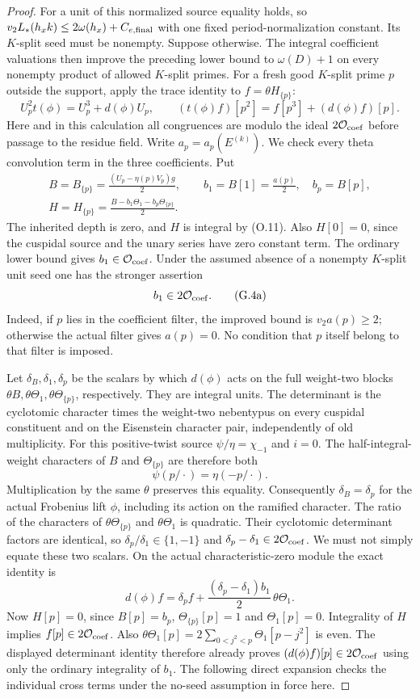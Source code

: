 \begin{proof}
For a unit of this normalized source equality holds, so
$v_2L_*(h_xk)\le2\omega(h_x)+C_{e,\rm final}$ with one fixed
period-normalization constant.
Its $K$-split seed must be nonempty. Suppose otherwise. The integral
coefficient valuations then improve the preceding lower bound to
$\omega(D)+1$ on every nonempty product of allowed $K$-split primes.
For a fresh good $K$-split prime $p$ outside the support, apply the
trace identity to $f=\theta H_{\{p\}}$:
\[
 U_p^2t(\phi)=U_p^3+d(\phi)U_p,\qquad
 (t(\phi)f)[p^2]=f[p^3]+(d(\phi)f)[p].
\]
Here and in this calculation all congruences are modulo the ideal
$2\mathcal O_{\rm coef}$ before passage to the residue field.
Write $a_p=a_p(E^{(k)})$.
We check every theta convolution term in the three coefficients.
Put
\[
\begin{gathered}
 B=B_{\{p\}}=\frac{(U_p-\eta(p)V_p)g}{2},\qquad
 b_1=B[1]=\frac{a(p)}2,\quad b_p=B[p],\\
 H=H_{\{p\}}=\frac{B-b_1\Theta_1-b_p\Theta_{\{p\}}}{2}.
\end{gathered}
\]
The inherited depth is zero, and $H$ is integral by (O.11).
Also $H[0]=0$, since the cuspidal source and the unary series have
zero constant term.
The ordinary lower bound gives $b_1\in\mathcal O_{\rm coef}$.
Under the assumed absence of a nonempty $K$-split unit seed one
has the stronger assertion
\[
                         b_1\in2\mathcal O_{\rm coef}.          \tag{G.4a}
\]
Indeed, if $p$ lies in the coefficient filter, the improved bound is
$v_2a(p)\ge2$; otherwise the actual filter gives $a(p)=0$.
No condition that $p$ itself belong to that filter is imposed.

Let $\delta_B,\delta_1,\delta_p$ be the scalars by which $d(\phi)$
acts on the full weight-two blocks
$\theta B,\theta\Theta_1,\theta\Theta_{\{p\}}$, respectively.
They are integral units.  The determinant is the cyclotomic character
times the weight-two nebentypus on every cuspidal constituent and
on the Eisenstein character pair, independently of old multiplicity.
For this positive-twist source $\psi/\eta=\chi_{-1}$ and $i=0$.
The half-integral-weight characters of $B$ and $\Theta_{\{p\}}$
are therefore both
\[
                 \psi(p/\cdot)=\eta(-p/\cdot).
\]
Multiplication by the same $\theta$ preserves this equality.
Consequently $\delta_B=\delta_p$ for the actual Frobenius lift
$\phi$, including its action on the ramified character.  The ratio
of the characters of $\theta\Theta_{\{p\}}$ and
$\theta\Theta_1$ is quadratic.  Their cyclotomic determinant factors
are identical, so $\delta_p/\delta_1\in\{1,-1\}$ and
$\delta_p-\delta_1\in2\mathcal O_{\rm coef}$.  We must not simply
equate these two scalars.  On the actual characteristic-zero
module the exact identity is
\[
 d(\phi)f=\delta_p f+
       \frac{(\delta_p-\delta_1)b_1}{2}\,\theta\Theta_1.
\]
Now $H[p]=0$, since $B[p]=b_p$, $\Theta_{\{p\}}[p]=1$ and
$\Theta_1[p]=0$.  Integrality of $H$ implies $f[p]\in2\mathcal O_{\rm coef}$.
Also $\theta\Theta_1[p]=2\sum_{0<j^2<p}\Theta_1[p-j^2]$ is even.
The displayed determinant identity therefore already proves
$(d(\phi)f)[p]\in2\mathcal O_{\rm coef}$ using only the ordinary
integrality of $b_1$.  The following direct expansion checks the
individual cross terms under the no-seed assumption in force here.


\end{proof}
